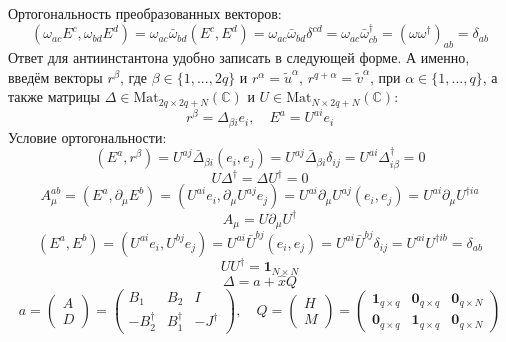 \documentclass[12pt]{article}
\theoremstyle{definition}
\begin{document}
Ортогональность преобразованных векторов:
\begin{equation}
    (\omega_{ac}E^c,\omega_{bd}E^d)=\omega_{ac}\bar{\omega}_{bd}(E^c,E^d)=\omega_{ac}\bar{\omega}_{bd}\delta^{cd}=\omega_{ac}\bar{\omega}^\dagger_{cb}=(\omega\omega^\dagger)_{ab}=\delta_{ab}
\end{equation}
Ответ для антиинстантона удобно записать в следующей форме. А именно, введём векторы $r^\beta$, где $\beta\in\{1,...,2q\}$ и $r^\alpha=\tilde{u}^\alpha$, $r^{q+\alpha}=\tilde{v}^\alpha$, при $\alpha\in\{1,...,q\}$, а также матрицы $\Delta\in\text{Mat}_{2q\times2q+N}(\mathbb{C})$ и $U\in\text{Mat}_{N\times2q+N}(\mathbb{C})$:
\begin{equation}
    r^\beta=\Delta_{\beta i}e_i,\quad E^a=U^{ai}e_i
\end{equation}
Условие ортогональности:
\begin{equation}
    (E^a,r^\beta)=U^{aj}\bar{\Delta}_{\beta i}(e_i,e_j)=U^{aj}\bar{\Delta}_{\beta i}\delta_{ij}=U^{ai}\Delta^\dagger_{i\beta}=0
\end{equation}
\begin{equation}
    U\Delta^\dagger=\Delta U^\dagger=0
\end{equation}
\begin{equation}
    A^{ab}_\mu=(E^a,\partial_\mu E^b)=(U^{ai}e_i,\partial_\mu U^{aj}e_j)=U^{ai}\partial_\mu U^{aj}(e_i,e_j)=U^{ai}\partial_\mu U^{\dagger ia}
\end{equation}
\begin{equation}
    A_\mu=U\partial_\mu U^\dagger
\end{equation}
\begin{equation}
    (E^a,E^b)=(U^{ai}e_i,U^{bj}e_j)=U^{ai}\bar{U}^{bj}(e_i,e_j)=U^{ai}\bar{U}^{bj}\delta_{ij}=U^{ai}U^{\dagger ib}=\delta_{ab}
\end{equation}
\begin{equation}
    UU^\dagger=\bm{1}_{N\times N}
\end{equation}
\begin{equation}
    \Delta=a+\hat{x}Q
\end{equation}
\begin{equation}
    a=\begin{pmatrix}
        A\\
        D
    \end{pmatrix}=\begin{pmatrix}
        B_1 & B_2 & I\\
        -B_2^\dagger & B_1^\dagger & -J^\dagger
    \end{pmatrix},\quad Q=\begin{pmatrix}
        H\\
        M
    \end{pmatrix}=\begin{pmatrix}
        \bm{1}_{q\times q}&\bm{0}_{q\times q}&\bm{0}_{q\times N}\\
        \bm{0}_{q\times q}&\bm{1}_{q\times q}&\bm{0}_{q\times N}
    \end{pmatrix}
\end{equation}
\end{document}
